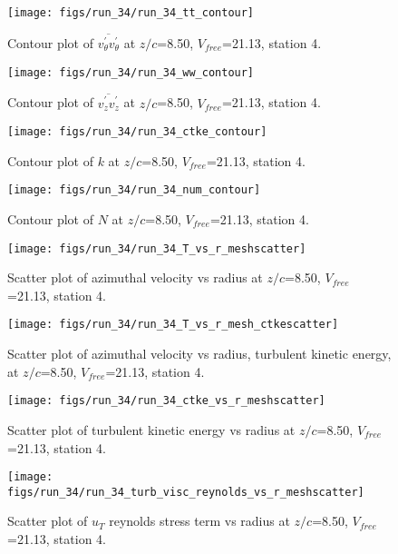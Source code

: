 \begin{figure}[H]
\centering
\texttt{[image: figs/run\_34/run\_34\_tt\_contour]}
\caption{Contour plot of $\overline{v_{\theta}^{\prime} v_{\theta}^{\prime}}$ at $z/c$=8.50, $V_{free}$=21.13, station 4.}
\end{figure}


\begin{figure}[H]
\centering
\texttt{[image: figs/run\_34/run\_34\_ww\_contour]}
\caption{Contour plot of $\overline{v_{z}^{\prime} v_{z}^{\prime}}$ at $z/c$=8.50, $V_{free}$=21.13, station 4.}
\end{figure}


\begin{figure}[H]
\centering
\texttt{[image: figs/run\_34/run\_34\_ctke\_contour]}
\caption{Contour plot of $k$ at $z/c$=8.50, $V_{free}$=21.13, station 4.}
\end{figure}


\begin{figure}[H]
\centering
\texttt{[image: figs/run\_34/run\_34\_num\_contour]}
\caption{Contour plot of $N$ at $z/c$=8.50, $V_{free}$=21.13, station 4.}
\end{figure}


\begin{figure}[H]
\centering
\texttt{[image: figs/run\_34/run\_34\_T\_vs\_r\_meshscatter]}
\caption{Scatter plot of azimuthal velocity vs radius at $z/c$=8.50, $V_{free}$=21.13, station 4.}
\end{figure}


\begin{figure}[H]
\centering
\texttt{[image: figs/run\_34/run\_34\_T\_vs\_r\_mesh\_ctkescatter]}
\caption{Scatter plot of azimuthal velocity vs radius, turbulent kinetic energy, at $z/c$=8.50, $V_{free}$=21.13, station 4.}
\end{figure}


\begin{figure}[H]
\centering
\texttt{[image: figs/run\_34/run\_34\_ctke\_vs\_r\_meshscatter]}
\caption{Scatter plot of turbulent kinetic energy vs radius at $z/c$=8.50, $V_{free}$=21.13, station 4.}
\end{figure}


\begin{figure}[H]
\centering
\texttt{[image: figs/run\_34/run\_34\_turb\_visc\_reynolds\_vs\_r\_meshscatter]}
\caption{Scatter plot of $
u_T$ reynolds stress term vs radius at $z/c$=8.50, $V_{free}$=21.13, station 4.}
\end{figure}



